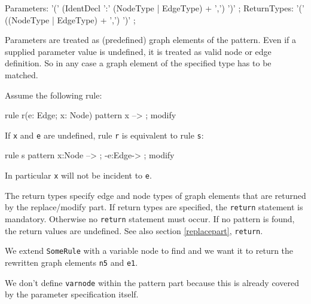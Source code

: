 \begin{rail}
  Parameters: '(' (IdentDecl ':' (NodeType | EdgeType) + ',') ')' ;
  ReturnTypes: '(' ((NodeType | EdgeType) + ',') ')' ;
\end{rail}
Parameters are treated as (predefined) graph elements of the pattern. Even if a supplied parameter value is undefined, it is treated as valid node or edge definition. So in any case a graph element of the specified type has to be matched.
\begin{example}
Assume the following rule:
\begin{grgen}
rule r(e: Edge; x: Node) {
  pattern {
    x --> ;
  }
  modify {}
}
\end{grgen}
If \texttt{x} and \texttt{e} are undefined, rule \texttt{r} is equivalent to rule \texttt{s}:
\begin{grgen}
rule s {
  pattern {
    x:Node --> ;
    -e:Edge-> ;
  }
  modify {}
}
\end{grgen}
In particular \texttt{x} will not be incident to \texttt{e}.
\end{example}
The return types specify edge and node types of graph elements that are returned by the replace/modify part. If return types are specified, the \texttt{return} statement is mandatory. Otherwise no \texttt{return} statement must occur. If no pattern is found, the return values are undefined. See also section \ref{replacepart}, \texttt{return}.
\begin{example}
We extend \texttt{SomeRule} with a variable node to find and we want it to return the rewritten graph elements \texttt{n5} and \texttt{e1}.
\begin{grgen}
  rule SomeRuleExt(varnode: Node): (Node, EdgeTypeB) {
    pattern {
      n1: NodeTypeA;
      ...
    }
    replace {
      varnode;
      ...  
      return(n5, e1);
      eval {
        ...
\end{grgen}
We don't define \texttt{varnode} within the pattern part because this is already covered by the parameter specification itself.
\end{example}

